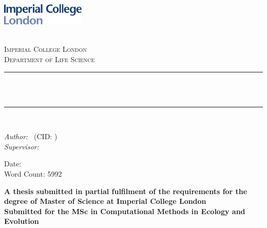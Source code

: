 \begin{titlepage}

\newcommand{\HRule}{\rule{\linewidth}{0.5mm}} %



\includegraphics[width = 4cm]{./figures/imperial}\\[0.5cm] 

\begin{center} %

\textsc{\LARGE \reporttype}\\[1.5cm] 
\textsc{\Large Imperial College London}\\[0.5cm] 
\textsc{\large Department of Life Science}\\[0.5cm] 

\HRule \\[0.4cm]
{ \huge \bfseries \reporttitle}\\ %
\HRule \\[1.5cm]
\end{center}

\begin{flushleft} \large
\textit{Author:}
\reportauthor~(CID: \cid) %
\\
\textit{Supervisor:}
\reportsupervisor~
\end{flushleft}
\vspace{2cm}
\makeatletter
Date: \@date \\
Word Count: 5992
\vfill %
\begin{center}
\textbf{A thesis submitted in partial fulfilment of the requirements for the degree of Master of Science at Imperial College London}\\
\textbf{Submitted for the MSc in Computational Methods in Ecology and Evolution}
\end{center}

\makeatother


\end{titlepage}

